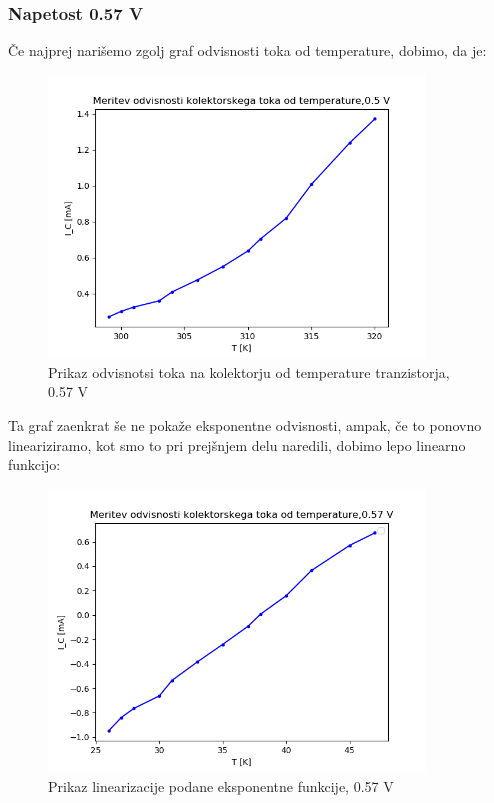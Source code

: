 \documentclass[11pt, a4paper]{article}
\theoremstyle{definition}
\theoremstyle{example}
\theoremstyle{izrek}
\begin{document}
\subsubsection{Napetost 0.57 V}
Če najprej narišemo zgolj graf odvisnosti toka od temperature, dobimo, da je: 
\begin{figure}[H]
    \centering
    \includegraphics[width=10cm]{Napetost-temperatura,0,57.png}
    \caption{Prikaz odvisnotsi toka na kolektorju od temperature tranzistorja, 0.57 V}
\end{figure}

Ta graf zaenkrat še ne pokaže eksponentne odvisnosti, ampak, če to ponovno lineariziramo, kot smo to pri prejšnjem delu naredili, dobimo lepo linearno funkcijo:
\begin{figure}[H]
    \centering
    \includegraphics[width=10cm]{Napetost-temperatura_fut,0,57.png}
    \caption{Prikaz linearizacije podane eksponentne funkcije, 0.57 V}
\end{figure}
\end{document}
